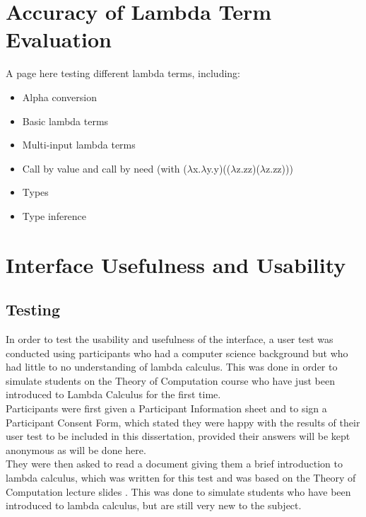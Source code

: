 \documentclass[a4paper,12pt]{report}
\begin{document}
\section{Accuracy of Lambda Term Evaluation}
\label{Accuracy of Lambda Term Evaluation}
A page here testing different lambda terms, including:
\begin{itemize}
	\item Alpha conversion
	\item Basic lambda terms
	\item Multi-input lambda terms
	\item Call by value and call by need (with ($\lambda$x.$\lambda$y.y)(($\lambda$z.zz)($\lambda$z.zz)))
	\item Types
	\item Type inference
\end{itemize}
\newpage

\section{Interface Usefulness and Usability}
\label{interface usefulness and usability}
\subsection{Testing}

In order to test the usability and usefulness of the interface, a user test was conducted using participants who had a computer science background but who had little to no understanding of lambda calculus. This was done in order to simulate students on the Theory of Computation course who have just been introduced to Lambda Calculus for the first time.\\

Participants were first given a Participant Information sheet and to sign a Participant Consent Form, which stated they were happy with the results of their user test to be included in this dissertation, provided their answers will be kept anonymous as will be done here.\\

They were then asked to read a document giving them a brief introduction to lambda calculus, which was written for this test and was based on the Theory of Computation lecture slides \cite{Gay2019}. This was done to simulate students who have been introduced to lambda calculus, but are still very new to the subject.\\
\end{document}
